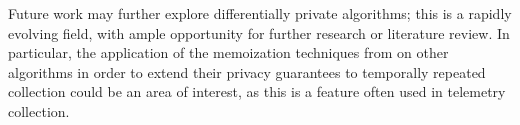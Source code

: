 \documentclass[12pt]{article}
\begin{document}
\bigskip

Future work may further explore differentially private algorithms; this is a rapidly evolving field, with ample opportunity for further research or literature review. In particular, the application of the memoization techniques from \cite{microsoft_telemetry} on other algorithms in order to extend their privacy guarantees to temporally repeated collection could be an area of interest, as this is a feature often used in telemetry collection.

\newpage

\printbibliography
\end{document}
